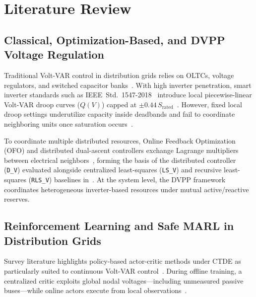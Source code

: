 \chapter{Literature Review}
\label{ch:literature_review}


\section{Classical, Optimization-Based, and DVPP Voltage Regulation}
Traditional Volt-VAR control in distribution grids relies on OLTCs, voltage regulators, and switched capacitor banks~\cite{Moutis2018,Satsangi2022}. With high inverter penetration, smart inverter standards such as IEEE~Std.~1547-2018~\cite{IEEE1547_2018} introduce local piecewise-linear Volt-VAR droop curves ($Q(V)$) capped at $\pm 0.44\,S_{\text{rated}}$~\cite{Satsangi2022}. However, fixed local droop settings underutilize capacity inside deadbands and fail to coordinate neighboring units once saturation occurs~\cite{Ortmann2020,Satsangi2022}.

To coordinate multiple distributed resources, Online Feedback Optimization (OFO) and distributed dual-ascent controllers exchange Lagrange multipliers between electrical neighbors~\cite{Ortmann2020}, forming the basis of the distributed controller (\texttt{D\_V}) evaluated alongside centralized least-squares (\texttt{LS\_V}) and recursive least-squares (\texttt{RLS\_V}) baselines in~\cite{Mughni2026}. At the system level, the DVPP framework~\cite{Marinescu2022,Haberle2023,Schulte2026} coordinates heterogeneous inverter-based resources under mutual active/reactive reserves.

\section{Reinforcement Learning and Safe MARL in Distribution Grids}
Survey literature highlights policy-based actor-critic methods under CTDE as particularly suited to continuous Volt-VAR control~\cite{Chen2022}. During offline training, a centralized critic exploits global nodal voltages—including unmeasured passive buses—while online actors execute from local observations~\cite{Chen2022}.

